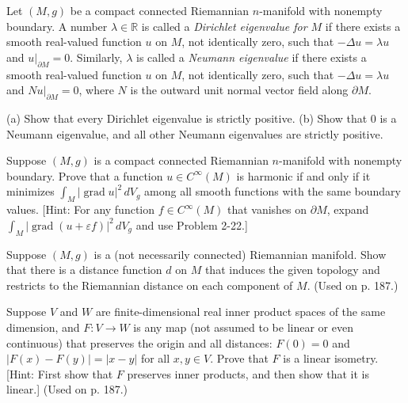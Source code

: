 \begin{exercise}\label{prob:dirichlet-neumann-eigenvalues}
Let $(M,g)$ be a compact connected Riemannian $n$-manifold with nonempty
boundary. A number $\lambda \in \mathbb{R}$ is called a \emph{Dirichlet eigenvalue for $M$} if there
exists a smooth real-valued function $u$ on $M$, not identically zero, such that
$-\Delta u = \lambda u$ and $u|_{\partial M} = 0$. Similarly, $\lambda$ is called a \emph{Neumann eigenvalue} if there exists a smooth real-valued function $u$ on $M$, not identically zero, such that $-\Delta u = \lambda u$ and $Nu|_{\partial M} = 0$, where $N$ is the outward unit normal vector field along $\partial M$.

(a) Show that every Dirichlet eigenvalue is strictly positive.
(b) Show that 0 is a Neumann eigenvalue, and all other Neumann eigenvalues are strictly positive.
\end{exercise}

\begin{exercise}
\label{prob:dirichlet-principle}
Suppose $(M,g)$ is a compact connected Riemannian $n$-manifold with nonempty boundary. Prove that a function $u \in C^{\infty}(M)$ is harmonic if and only if it minimizes $\int_M |\operatorname{grad} u|^2 \, dV_g$ among all smooth functions with the same boundary values. [Hint: For any function $f \in C^{\infty}(M)$ that vanishes on $\partial M$, expand $\int_M |\operatorname{grad}(u + \varepsilon f)|^2 \, dV_g$ and use Problem 2-22.]
\end{exercise}

\begin{exercise}\label{prob:distance-disconnected-riemannian}
Suppose $(M,g)$ is a (not necessarily connected) Riemannian manifold. Show that there is a distance function $d$ on $M$ that induces the given topology and restricts to the Riemannian distance on each component of $M$. (Used on p. 187.)
\end{exercise}

\begin{exercise}\label{prob:distance-preserving-map-linear-isometry}


Suppose $V$ and $W$ are finite-dimensional real inner product spaces of the same dimension, and $F: V \to W$ is any map (not assumed to be linear or even continuous) that preserves the origin and all distances: $F(0) = 0$ and $|F(x) - F(y)| = |x - y|$ for all $x, y \in V$. Prove that $F$ is a linear isometry. [Hint: First show that $F$ preserves inner products, and then show that it is linear.] (Used on p. 187.)
\end{exercise}

